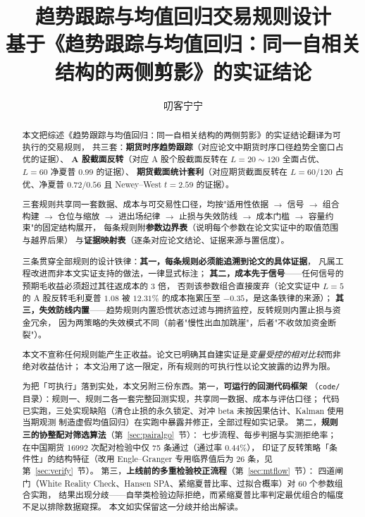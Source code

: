 \documentclass[11pt,a4paper]{ctexart}
\title{\bfseries 趋势跟踪与均值回归交易规则设计\\[3pt]
\large 基于《趋势跟踪与均值回归：同一自相关结构的两侧剪影》的实证结论}
\author{叨客宁宁}
\date{}
\begin{document}
\maketitle

\begin{abstract}
\noindent 本文把综述《趋势跟踪与均值回归：同一自相关结构的两侧剪影》的实证结论翻译为可执行的交易规则，
共三套：\textbf{期货时序趋势跟踪}（对应论文中期货时序口径趋势全窗口占优的证据）、
\textbf{A 股截面反转}（对应 A 股个股截面反转在 $L=20\sim120$ 全面占优、$L=60$ 净夏普 $0.99$ 的证据）、
\textbf{期货截面统计套利}（对应期货截面反转在 $L=60/120$ 占优、净夏普 $0.72/0.56$ 且
Newey--West $t=2.59$ 的证据）。

三套规则共享同一套数据、成本与可交易性口径，均按"适用性依据 $\to$ 信号 $\to$ 组合构建 $\to$
仓位与缩放 $\to$ 进出场纪律 $\to$ 止损与失效防线 $\to$ 成本门槛 $\to$ 容量约束"的固定结构展开，
每条规则附\textbf{参数边界表}（说明每个参数在论文实证中的取值范围与越界后果）
与\textbf{证据映射表}（逐条对应论文结论、证据来源与置信度）。

三条贯穿全部规则的设计铁律：\textbf{其一，每条规则必须能追溯到论文的具体证据}，
凡属工程改进而非本文实证支持的做法，一律显式标注；
\textbf{其二，成本先于信号}——任何信号的预期毛收益必须超过其往返成本的 3 倍，
否则该参数组合直接废弃（论文实证中 $L=5$ 的 A 股反转毛利夏普 $1.08$ 被 $12.31\%$ 的成本拖累压至 $-0.35$，是这条铁律的来源）；
\textbf{其三，失效防线内置}——趋势规则内置恐慌状态过滤与拥挤监控，反转规则内置止损与资金冗余，
因为两策略的失效模式不同（前者"慢性出血加跳崖"，后者"不收敛加资金断裂"）。

本文不宣称任何规则能产生正收益。论文已明确其自建实证是\emph{变量受控的相对比较}而非绝对收益估计；
本文沿用了这一限定，所有规则的可执行性以论文披露的边界为限。

为把「可执行」落到实处，本文另附三份东西。第一，\textbf{可运行的回测代码框架}
（\texttt{code/} 目录）：规则一、规则二各一套完整回测实现，共享同一数据、成本与评估口径；
代码已实跑，三处实现缺陷（清仓止损的永久锁定、对冲 beta 未按因果估计、Kalman 使用当期观测
制造虚假均值回归）在实跑中暴露并修正，全部过程如实记录。
第二，\textbf{规则三的协整配对筛选算法}（第~\ref{sec:pairalgo}~节）：
七步流程、每步判据与实测拒绝率；在中国期货 16992 次配对检验中仅 75 条通过（通过率 $0.44\%$），
印证了反转策略「条件性」的结构特征（改用 Engle--Granger 专用临界值后为 26 条，见第~\ref{sec:verify}~节）。
第三，\textbf{上线前的多重检验校正流程}（第~\ref{sec:mtflow}~节）：
四道闸门（White Reality Check、Hansen SPA、紧缩夏普比率、过拟合概率）对 60 个参数组合实跑，
结果出现分歧——自举类检验边际拒绝，而紧缩夏普比率判定最优组合的幅度不足以排除数据窥探。
本文如实保留这一分歧并给出解读。


\end{abstract}
\end{document}
